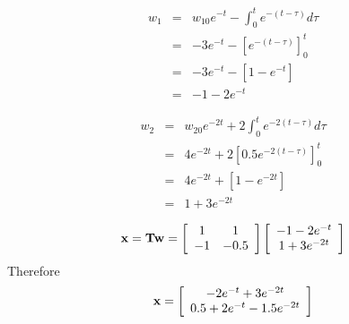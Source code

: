 \begin{eqnarray*}
	w_1 & = & w_{10}e^{-t}-\int_0^t e^{-(t-\tau)} d\tau \\
	    & = & -3e^{-t}-\left[e^{-(t-\tau)}\right]_0^t \\
	    & = & -3e^{-t}-\left[1 - e^{-t}\right] \\
	    & = & -1 -2e^{-t}	
\end{eqnarray*}
 
\begin{eqnarray*}
	w_2 & = & w_{20}e^{-2t}+2\int_0^t e^{-2(t-\tau)} d\tau \\
	    & = & 4e^{-2t}+2\left[0.5e^{-2(t-\tau)}\right]_0^t \\
	    & = & 4e^{-2t}+\left[1 - e^{-2t}\right] \\
	    & = & 1 + 3e^{-2t}	
\end{eqnarray*}

\[
{\bf{x}} = {\bf{Tw}} = \left[ {\begin{array}{*{20}c}
   1 & 1  \\
   { - 1} & { - 0.5}  \\
\end{array}} \right]\left[ {\begin{array}{*{20}c}
   { - 1 - 2e^{ - t} }  \\
   {1 + 3e^{ - 2t} }  \\
\end{array}} \right]
\]
Therefore
\[
{\bf{x}} = \left[ {\begin{array}{*{20}c}
   { - 2e^{ - t}  + 3e^{ - 2t} }  \\
   {0.5 + 2e^{ - t}  - 1.5e^{ - 2t} }  \\
\end{array}} \right]
\]


